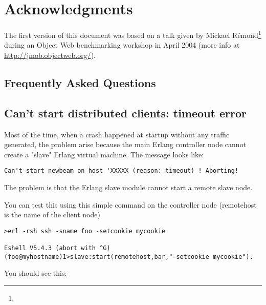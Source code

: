 \documentclass{TSUNG-en}
\begin{document}
\section{Acknowledgments}

The first version of this document was based on a talk given by Mickael
Rémond\footnote{} during an Object
Web benchmarking workshop in April 2004 (more info at
\url{http://jmob.objectweb.org/}).


\begin{appendix}

\section{Frequently Asked Questions}

\subsection{Can't start distributed clients: timeout error }

Most of the time, when a crash happened at startup without any traffic
generated, the problem arise because the main Erlang controller node cannot
create a "slave" Erlang virtual machine. The message looks like:

\begin{Verbatim}
Can't start newbeam on host 'XXXXX (reason: timeout) ! Aborting!
\end{Verbatim}


The problem is that the Erlang slave module cannot start a remote slave
node.

You can test this using this simple command on the controller node
(remotehost is the name of the client node)
\begin{Verbatim}
>erl -rsh ssh -sname foo -setcookie mycookie

Eshell V5.4.3 (abort with ^G)
(foo@myhostname)1>slave:start(remotehost,bar,"-setcookie mycookie").
\end{Verbatim}
You should see this: 


\end{appendix}
\end{document}
